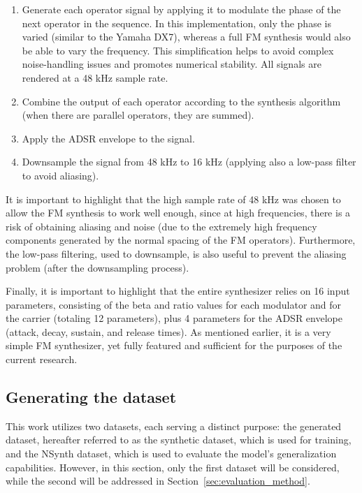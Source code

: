 \documentclass[10pt,conference]{IEEEtran}
\begin{document}
\begin{enumerate}
    \item Generate each operator signal by applying it to modulate the phase of the next operator in the sequence. In this implementation, only the phase is varied (similar to the Yamaha DX7), whereas a full FM synthesis would also be able to vary the frequency. This simplification helps to avoid complex noise-handling issues and promotes numerical stability. All signals are rendered at a 48 kHz sample rate.
    \item Combine the output of each operator according to the synthesis algorithm (when there are parallel operators, they are summed).
    \item Apply the ADSR envelope to the signal.
    \item Downsample the signal from 48 kHz to 16 kHz (applying also a low-pass filter to avoid aliasing).
\end{enumerate}

It is important to highlight that the high sample rate of 48 kHz was chosen to allow the FM synthesis to work well enough, since at high frequencies, there is a risk of obtaining aliasing and noise (due to the extremely high frequency components generated by the normal spacing of the FM operators). Furthermore, the low-pass filtering, used to downsample, is also useful to prevent the aliasing problem (after the downsampling process).

Finally, it is important to highlight that the entire synthesizer relies on 16 input parameters, consisting of the beta and ratio values for each modulator and for the carrier (totaling 12 parameters), plus 4 parameters for the ADSR envelope (attack, decay, sustain, and release times). As mentioned earlier, it is a very simple FM synthesizer, yet fully featured and sufficient for the purposes of the current research.

\subsection{Generating the dataset}

This work utilizes two datasets, each serving a distinct purpose: the generated dataset, hereafter referred to as the synthetic dataset, which is used for training, and the NSynth dataset, which is used to evaluate the model’s generalization capabilities. However, in this section, only the first dataset will be considered, while the second will be addressed in Section~\ref{sec:evaluation_method}.
\end{document}
